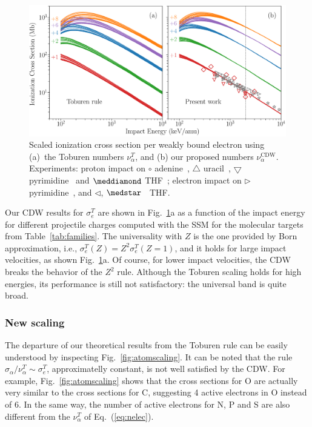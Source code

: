 \documentclass[preprint,12pt]{article}
\begin{document}
\begin{figure}[t!]
\centering
\includegraphics[width=\textwidth]{figuras/molscaling85.eps}
\caption{Scaled ionization cross section per weakly bound electron using
(a)~the Toburen numbers $\nu_{\alpha}^T$, and (b) our proposed numbers
$\nu_{\alpha}^{\text{CDW}}$. Experiments: proton impact on 
$\circ$ adenine~\cite{iriki2011}, $\triangle$ uracil~\cite{itoh2013}, 
$\bigtriangledown$ pyrimidine~\cite{wolff2014} and $\meddiamond$ 
THF~\cite{wang2016}; electron impact on $\rhd$ pyrimidine~\cite{bug2017},
and $\lhd$, $\medstar$~\cite{wolf2019,fuss2009} THF.}
\label{fig:newscaling}
\end{figure}

Our CDW results for $\sigma_{e}^T$ are shown in 
Fig.~\ref{fig:newscaling}a as a function of 
the impact energy for different projectile charges computed with the 
SSM for the molecular targets from Table~\ref{tab:families}. 
The universality with $Z$ is the one provided 
by Born approximation, i.e., $\sigma_{e}^T(Z)=Z^{2}\sigma_{e}^T(Z=1)$, 
and it holds for large impact velocities, as shown 
Fig.~\ref{fig:newscaling}a.
Of course, for lower impact velocities, the CDW breaks the behavior of 
the $Z^{2}$ rule. Although the Toburen scaling holds for high energies, 
its performance is still not satisfactory: the universal band is quite 
broad. 

\subsubsection{New scaling}

The departure of our theoretical 
results from the Toburen rule can be easily understood %
by inspecting Fig.~\ref{fig:atomscaling}. It can be noted that the 
rule $\sigma_{\alpha}/\nu_{\alpha}^T\sim \sigma_{e}^T$, approximatelly 
constant, is not well satisfied by the CDW. 
For example, Fig.~\ref{fig:atomscaling} shows that the cross sections
for O are actually very similar to the cross sections for C, suggesting 
4 active electrons in O instead of 6. In the same way, the number of
active electrons for N, P and S are also different from the 
$\nu_{\alpha}^T$ of Eq.~(\ref{eq:nelec}). 
\end{document}
